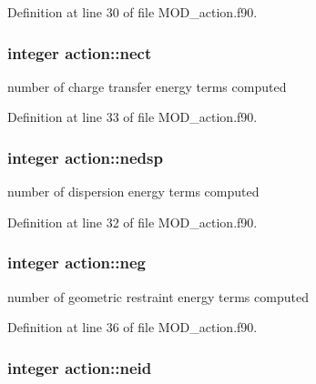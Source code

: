 Definition at line 30 of file M\-O\-D\-\_\-action.\-f90.

\hypertarget{classaction_a9e108e858cb8fc8521a9537c16bb0277}{
\subsubsection[{nect}]{\setlength{\rightskip}{0pt plus 5cm}integer action\-::nect}}\label{classaction_a9e108e858cb8fc8521a9537c16bb0277}


number of charge transfer energy terms computed 



Definition at line 33 of file M\-O\-D\-\_\-action.\-f90.

\hypertarget{classaction_af966f559f230d5a1691eaff3323a3d2d}{
\subsubsection[{nedsp}]{\setlength{\rightskip}{0pt plus 5cm}integer action\-::nedsp}}\label{classaction_af966f559f230d5a1691eaff3323a3d2d}


number of dispersion energy terms computed 



Definition at line 32 of file M\-O\-D\-\_\-action.\-f90.

\hypertarget{classaction_afd909afc671accddccd25524191f0352}{
\subsubsection[{neg}]{\setlength{\rightskip}{0pt plus 5cm}integer action\-::neg}}\label{classaction_afd909afc671accddccd25524191f0352}


number of geometric restraint energy terms computed 



Definition at line 36 of file M\-O\-D\-\_\-action.\-f90.

\hypertarget{classaction_a948e8253badc8aa179fdbccc1fbb6be7}{
\subsubsection[{neid}]{\setlength{\rightskip}{0pt plus 5cm}integer action\-::neid}}\label{classaction_a948e8253badc8aa179fdbccc1fbb6be7}


